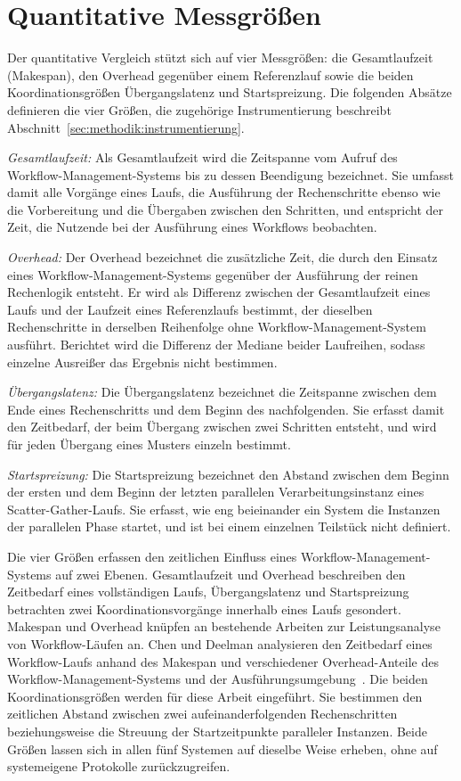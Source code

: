 \section{Quantitative Messgrößen}
\label{sec:methodik:messgroessen}
Der quantitative Vergleich stützt sich auf vier Messgrößen: die Gesamtlaufzeit (Makespan), den Overhead gegenüber einem Referenzlauf sowie die beiden Koordinationsgrößen Übergangslatenz und Startspreizung. Die folgenden Absätze definieren die vier
Größen, die zugehörige Instrumentierung beschreibt
Abschnitt~\ref{sec:methodik:instrumentierung}.

\emph{Gesamtlaufzeit:} Als Gesamtlaufzeit wird die Zeitspanne vom
Aufruf des Workflow-Management-Systems bis zu dessen Beendigung
bezeichnet. Sie umfasst damit alle Vorgänge eines Laufs, die
Ausführung der Rechenschritte ebenso wie die Vorbereitung und die
Übergaben zwischen den Schritten, und entspricht der Zeit, die
Nutzende bei der Ausführung eines Workflows beobachten.

\emph{Overhead:} Der Overhead bezeichnet die zusätzliche Zeit, die durch den Einsatz eines Workflow-Management-Systems gegenüber der Ausführung der reinen Rechenlogik entsteht. Er wird als Differenz zwischen der Gesamtlaufzeit eines Laufs und der Laufzeit eines Referenzlaufs bestimmt, der dieselben Rechenschritte in derselben Reihenfolge ohne Workflow-Management-System ausführt. Berichtet wird die Differenz der Mediane beider Laufreihen, sodass einzelne Ausreißer das Ergebnis nicht bestimmen.

\emph{Übergangslatenz:} Die Übergangslatenz bezeichnet die
Zeitspanne zwischen dem Ende eines Rechenschritts und dem Beginn des
nachfolgenden. Sie erfasst damit den Zeitbedarf, der beim Übergang
zwischen zwei Schritten entsteht, und wird für jeden Übergang eines
Musters einzeln bestimmt.

\emph{Startspreizung:} Die Startspreizung bezeichnet den Abstand
zwischen dem Beginn der ersten und dem Beginn der letzten parallelen
Verarbeitungsinstanz eines Scatter-Gather-Laufs. Sie erfasst, wie
eng beieinander ein System die Instanzen der parallelen Phase startet,
und ist bei einem einzelnen Teilstück nicht definiert.

Die vier Größen erfassen den zeitlichen Einfluss eines
Workflow-Management-Systems auf zwei Ebenen. Gesamtlaufzeit und
Overhead beschreiben den Zeitbedarf eines vollständigen Laufs,
Übergangslatenz und Startspreizung betrachten zwei
Koordinationsvorgänge innerhalb eines Laufs gesondert. Makespan und
Overhead knüpfen an bestehende Arbeiten zur Leistungsanalyse von
Workflow-Läufen an. Chen und Deelman analysieren den Zeitbedarf
eines Workflow-Laufs anhand des Makespan und verschiedener
Overhead-Anteile des Workflow-Management-Systems und der
Ausführungsumgebung~\cite{chen2011overhead}. Die beiden
Koordinationsgrößen werden für diese Arbeit eingeführt. Sie
bestimmen den zeitlichen Abstand zwischen zwei aufeinanderfolgenden
Rechenschritten beziehungsweise die Streuung der Startzeitpunkte
paralleler Instanzen. Beide Größen lassen sich in allen fünf
Systemen auf dieselbe Weise erheben, ohne auf systemeigene
Protokolle zurückzugreifen.

